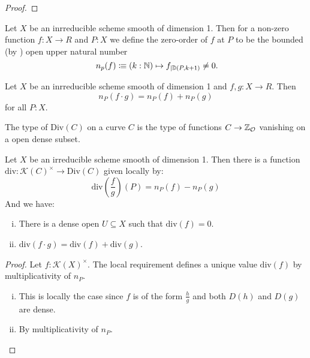 \begin{proof}
\end{proof}

\begin{definition}
  Let $X$ be an inrreducible scheme smooth of dimension 1.
  Then for a non-zero function $f:X\to R$ and $P:X$ we define the zero-order of $f$ at $P$ to be
  the bounded (by ) open upper natural number
  \[
  n_p(f)\colonequiv (k:\N)\mapsto f_{\mid \D(P,k+1)}\neq 0
  \rlap{.}
  \]
\end{definition}

\begin{lemma}
  Let $X$ be an inrreducible scheme smooth of dimension 1 and $f,g:X\to R$.
  Then
  \[
  n_P(f\cdot g)=n_P( f) + n_P (g)
  \]
  for all $P:X$.
\end{lemma}

\begin{definition}
  The type of  $\mathrm{Div}(C)$ on a curve $C$ is
  the type of functions $C\to \mathbb{Z}_{\mathcal O}$ vanishing on a open dense subset.
\end{definition}

\begin{theorem}
  Let $X$ be an irreducible scheme smooth of dimension 1.
  Then there is a function $\mathrm{div}:\mathcal K(C)^\times \to \mathrm{Div}(C)$ given locally by:
  \[
  \mathrm{div}(\frac{f}{g})(P)=n_P(f)-n_P(g)
  \]
  And we have:
  \begin{enumerate}[(i)]
  \item There is a dense open $U\subseteq X$ such that $\mathrm{div}(f)=0$.
  \item $\mathrm{div}(f\cdot g)=\mathrm{div}(f)+\mathrm{div}(g)$.
  \end{enumerate}
\end{theorem}

\begin{proof}
  Let $f:\mathcal K(X)^\times$.
  The local requirement defines a unique value $\mathrm{div}(f)$ by multiplicativity of $n_P$.
  \begin{enumerate}[(i)]
  \item This is locally the case since $f$ is of the form $\frac{h}{g}$ and both $D(h)$ and $D(g)$ are dense.
  \item By multiplicativity of $n_P$.
  \end{enumerate}
\end{proof}

